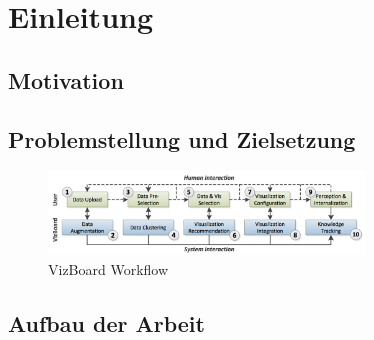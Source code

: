 \documentclass[
	headsepline,
	footsepline,
	fontsize=12pt,
	bibliography=totoc
]{scrbook}
\begin{document}
\frontmatter
{}
\mmtfrontmatter

\listoffigures
\listoftables
\printglossary[type=\acronymtype,style=long,title=Abkürzungsverzeichnis,toctitle=Abkürzungsverzeichnis]

\mainmatter

\chapter{Einleitung}
\label{chapter:einleitung}


\section{Motivation}
\label{section:motivation}


\section{Problemstellung und Zielsetzung}
\label{section:problemstellung}


\begin{figure}[htbp]
	\centering
	\includegraphics[width=0.75\textwidth]{images/vizboard_workflow.png}
	\caption{VizBoard Workflow}
	\label{figure:vizboard_workflow}
\end{figure}

\section{Aufbau der Arbeit}
\label{section:aufbau}
\end{document}
